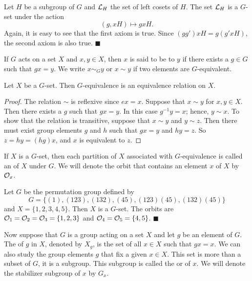  
\medskip
 
 
Let $H$ be a subgroup of $G$ and ${\cal L}_H$ the set of left cosets
of $H$.  The set ${\cal L}_H$ is a $G$-set under the action
$$
(g, xH) \mapsto gxH.
$$
Again, it is easy to see that the first axiom is true. Since $(g g')xH
= g( g'x H)$, the second axiom is  also true.
\hspace{\fill} $\blacksquare$
 
 
\medskip
 
 
If $G$ acts on a set $X$ and $x, y \in X$, then $x$ is said to be
 to $y$ if there exists a
$g \in G$ such that $gx =y$. We  write $x \sim_G y$ or $x \sim y$ if
two elements are $G$-equivalent. 
 
 
\begin{proposition}
Let  $X$ be a $G$-set. Then $G$-equivalence is an equivalence relation
on $X$. 
\end{proposition}
 
 
\begin{proof}
The relation $\sim$ is reflexive since $ex = x$. Suppose that $x \sim
y$ for $x, y \in X$. Then there exists a $g$ such that $gx = y$. In
this case $g^{-1}y=x$; hence, $y \sim x$. To show that the relation is
transitive, suppose that $x \sim y$ and $y \sim z$. Then there must
exist group elements $g$ and $h$ such that $gx = y$ and $hy= z$. So $z
= hy = (hg)x$, and  $x$ is equivalent to $z$.
\end{proof}
 
 
\medskip
 
 
If $X$ is a $G$-set, then each partition of $X$ associated with
$G$-equivalence is called an  of $X$ under
$G$.  We will denote the orbit that contains an element $x$  of $X$ by
${\cal O}_x$\label{noteorbit}. 
 
 
\medskip
 
 
Let $G$ be the permutation group defined by
$$
G =\{(1), (1 2
3), (1 3 2), (4 5), (1 2 3)(4 5), (1 3 2)(4 5) \}
$$
and $X = \{ 1, 2, 3, 4, 5\}$. Then $X$ is a $G$-set. The orbits are
${\cal O}_1 = {\cal O}_2 = {\cal O}_3 =\{1, 2, 3\}$ and $ {\cal O}_4=
{\cal O}_5 = \{4, 5\}$. 
\hspace{\fill} $\blacksquare$
 
 
\medskip
 
 
Now suppose that $G$ is a group acting on a set $X$ and let $g$ be
an element of $G$. The  of $g$ in $X$, denoted by $X_g$\label{notefixed}, is the set of 
all $x \in X$ such
that $gx = x$.  We can also study the group elements $g$ that fix a
given $x \in X$. This set is more than a subset of  $G$, it is a
subgroup.  This subgroup is called the  or  of $x$. We will denote the 
stabilizer subgroup of $x$ by $G_x$\label{noteisotropy}. 
 

